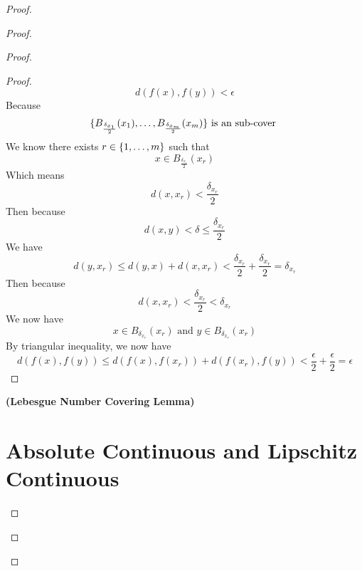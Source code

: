 \documentclass{report}
\begin{document}
\begin{proof}
\begin{proof}
\begin{proof}
\begin{proof}
\begin{equation*}
d(f(x),f(y))<\epsilon 
\end{equation*}
Because 
\begin{equation*}
\{ B_{\frac{\delta_{x_1}}{2}}(x_1),\dots ,B_{\frac{\delta_{x_m}}{2}}(x_m) \}\text{ is an sub-cover }
\end{equation*}
We know there exists $r\in \{ 1,\dots ,m \}$ such that 
\begin{equation*}
x\in B_{\frac{\delta_{x_r}}{2}}(x_r)
\end{equation*}
Which means 
\begin{equation*}
d(x,x_r)<\frac{\delta_{x_r}}{2}
\end{equation*}
Then because 
 \begin{equation*}
d(x,y)<\delta \leq \frac{\delta_{x_r}}{2}
\end{equation*}
We have 
\begin{equation*}
d(y,x_r)\leq d(y,x)+d(x,x_r)<\frac{\delta_{x_r}}{2}+\frac{\delta_{x_r}}{2}=\delta_{x_r}
\end{equation*}
Then because 
\begin{equation*}
d(x,x_r)<\frac{\delta_{x_r}}{2}<\delta_{x_r}
\end{equation*}
We now have
\begin{equation*}
x\in B_{\delta_{x_r}}(x_r)\text{ and }y\in B_{\delta_{x_r}}(x_r)
\end{equation*}
By triangular inequality, we now have
\begin{equation*}
d(f(x),f(y))\leq d(f(x),f(x_r))+d(f(x_r),f(y))<\frac{\epsilon}{2}+\frac{\epsilon}{2}=\epsilon 
\end{equation*}



\end{proof}
\begin{lemma}
  \textbf{(Lebesgue Number Covering Lemma)}
\end{lemma}
\section{Absolute Continuous and Lipschitz Continuous}


\end{proof}
\end{proof}
\end{proof}
\end{document}
